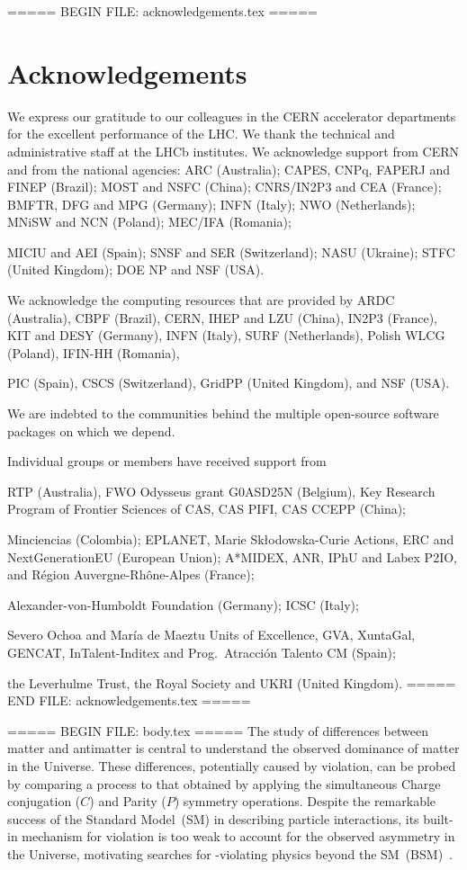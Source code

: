 ===== BEGIN FILE: acknowledgements.tex =====
\section*{Acknowledgements}



\noindent We express our gratitude to our colleagues in the CERN
accelerator departments for the excellent performance of the LHC. We
thank the technical and administrative staff at the LHCb
institutes.
We acknowledge support from CERN and from the national agencies:
ARC (Australia);
CAPES, CNPq, FAPERJ and FINEP (Brazil);
MOST and NSFC (China);
CNRS/IN2P3 and CEA (France);
BMFTR, DFG and MPG (Germany);
INFN (Italy);
NWO (Netherlands);
MNiSW and NCN (Poland);
MEC/IFA (Romania);

MICIU and AEI (Spain);
SNSF and SER (Switzerland);
NASU (Ukraine);
STFC (United Kingdom);
DOE NP and NSF (USA).

We acknowledge the computing resources that are provided by ARDC (Australia),
CBPF (Brazil),
CERN,
IHEP and LZU (China),
IN2P3 (France),
KIT and DESY (Germany),
INFN (Italy),
SURF (Netherlands),
Polish WLCG (Poland),
IFIN-HH (Romania),

PIC (Spain), CSCS (Switzerland),
GridPP (United Kingdom),
and NSF (USA).

We are indebted to the communities behind the multiple open-source
software packages on which we depend.

Individual groups or members have received support from

RTP (Australia),
FWO Odysseus grant G0ASD25N (Belgium),
Key Research Program of Frontier Sciences of CAS, CAS PIFI, CAS CCEPP (China);


Minciencias (Colombia);
EPLANET, Marie Sk\l{}odowska-Curie Actions, ERC and NextGenerationEU (European Union);
A*MIDEX, ANR, IPhU and Labex P2IO, and R\'{e}gion Auvergne-Rh\^{o}ne-Alpes (France);

Alexander-von-Humboldt Foundation (Germany);
ICSC (Italy);

Severo Ochoa and Mar\'ia de Maeztu Units of Excellence, GVA, XuntaGal, GENCAT, InTalent-Inditex and Prog.~Atracci\'on Talento CM (Spain);


the Leverhulme Trust, the Royal Society and UKRI (United Kingdom).
===== END FILE: acknowledgements.tex =====

===== BEGIN FILE: body.tex =====
\noindent The study of differences between matter and antimatter is central to understand the observed dominance of matter in the Universe. These differences, potentially caused by \CP violation, can be probed by comparing a process to that obtained by applying the simultaneous Charge conjugation ($C$) and Parity ($P$) symmetry operations. Despite the remarkable success of the Standard Model~(SM) in describing particle interactions, its built-in mechanism for \CP violation is too weak to account for the observed asymmetry in the Universe, motivating searches for \CP-violating physics beyond the SM~(BSM)~\cite{Gavela:1993ts}.

